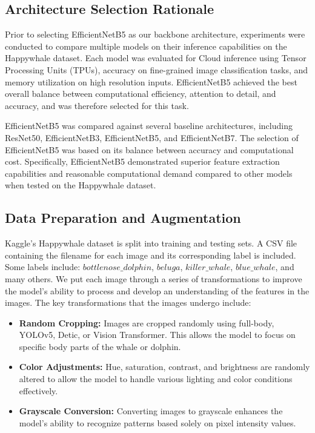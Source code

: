 \documentclass[twocolumn]{article}
\begin{document}
\subsection{Architecture Selection Rationale}

Prior to selecting EfficientNetB5 as our backbone architecture, experiments were conducted to compare multiple models on their inference capabilities on the Happywhale dataset. Each model was evaluated for Cloud inference using Tensor Processing Units (TPUs), accuracy on fine-grained image classification tasks, and memory utilization on high resolution inputs. EfficientNetB5 achieved the best overall balance between computational efficiency, attention to detail, and accuracy, and was therefore selected for this task.

EfficientNetB5 was compared against several baseline architectures, including ResNet50, EfficientNetB3, EfficientNetB5, and EfficientNetB7. The selection of EfficientNetB5 was based on its balance between accuracy and computational cost. Specifically, EfficientNetB5 demonstrated superior feature extraction capabilities and reasonable computational demand compared to other models when tested on the Happywhale dataset.

\subsection{Data Preparation and Augmentation}

Kaggle’s Happywhale dataset is split into training and testing sets. A CSV file containing the filename for each image and its corresponding label is included. Some labels include: \(bottlenose\_dolphin\), \(beluga\), \(killer\_whale\), \(blue\_whale\), and many others. We put each image through a series of transformations to improve the model’s ability to process and develop an understanding of the features in the images. The key transformations that the images undergo include:

\begin{itemize}
    \item \textbf{Random Cropping:} Images are cropped randomly using full-body, YOLOv5, Detic, or Vision Transformer. This allows the model to focus on specific body parts of the whale or dolphin.
    \item \textbf{Color Adjustments:} Hue, saturation, contrast, and brightness are randomly altered to allow the model to handle various lighting and color conditions effectively.
    \item \textbf{Grayscale Conversion:} Converting images to grayscale enhances the model’s ability to recognize patterns based solely on pixel intensity values. 
\end{itemize}
\end{document}
